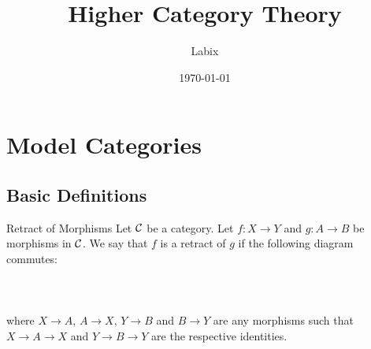 \documentclass[a4paper]{article}
\title{Higher Category Theory}
\author{Labix}
\date{\today}
\begin{document}
\maketitle
\begin{abstract}
\begin{itemize}
\end{itemize}
\end{abstract}
\pagebreak
\tableofcontents

\pagebreak
\section{Model Categories}
\subsection{Basic Definitions}
\begin{defn}{Retract of Morphisms}{} Let $\mathcal{C}$ be a category. Let $f:X\to Y$ and $g:A\to B$ be morphisms in $\mathcal{C}$. We say that $f$ is a retract of $g$ if the following diagram commutes: \\~\\
\\~\\
where $X\to A$, $A\to X$, $Y\to B$ and $B\to Y$ are any morphisms such that $X\to A\to X$ and $Y\to B\to Y$ are the respective identities. 
\end{defn}
\end{document}
